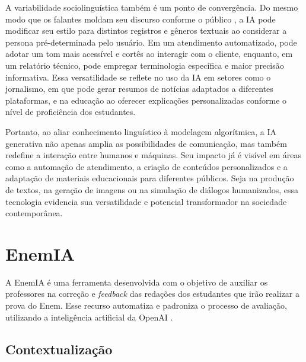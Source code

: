 \documentclass[portuguese]{textolivre}
\begin{document}
A variabilidade sociolinguística também é um ponto de convergência. Do mesmo modo que os falantes moldam seu discurso conforme o público \cite{silva2024generos}, a IA pode modificar seu estilo para distintos registros e gêneros textuais ao considerar a persona pré-determinada pelo usuário. Em um atendimento automatizado, pode adotar um tom mais acessível e cortês ao interagir com o cliente, enquanto, em um relatório técnico, pode empregar terminologia específica e maior precisão informativa. Essa versatilidade se reflete no uso da IA em setores como o jornalismo, em que pode gerar resumos de notícias adaptados a diferentes plataformas, e na educação ao oferecer explicações personalizadas conforme o nível de proficiência dos estudantes.

Portanto, ao aliar conhecimento linguístico à modelagem algorítmica, a IA generativa não apenas amplia as possibilidades de comunicação, mas também redefine a interação entre humanos e máquinas. Seu impacto já é visível em áreas como a automação de atendimento, a criação de conteúdos personalizados e a adaptação de materiais educacionais para diferentes públicos. Seja na produção de textos, na geração de imagens ou na simulação de diálogos humanizados, essa tecnologia evidencia sua versatilidade e potencial transformador na sociedade contemporânea.

\section{EnemIA}\label{enem}

A EnemIA é uma ferramenta desenvolvida com o objetivo de auxiliar os professores na correção e \textit{feedback} das redações dos estudantes que irão realizar a prova do Enem. Esse recurso automatiza e padroniza o processo de avaliação, utilizando a inteligência artificial da OpenAI \cite{openaii}.

\subsection{\textbf{Contextualização}}
\end{document}
